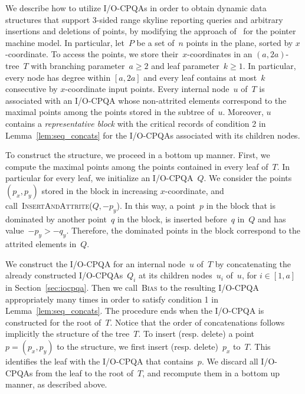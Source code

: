 \documentclass[]{article}
\begin{document}
We describe how to utilize I/O-CPQAs in order to obtain dynamic data structures
that support 3-sided range skyline reporting queries and arbitrary insertions
and deletions of points, by modifying the approach of~\cite{OL81} for the
pointer machine model. In particular, let~$P$ be a set of~$n$ points in the
plane, sorted by $x$-coordinate. To access the points, we store
their~$x$-coordinates in an $(a,2a)$-tree~$T$ with branching parameter~$a\geq 2$
and leaf parameter~$k\geq1$. In particular, every node has degree within
$[a,2a]$ and every leaf contains at most~$k$ consecutive by $x$-coordinate input
points. Every internal node~$u$ of~$T$ is associated with an I/O-CPQA whose
non-attrited elements correspond to the maximal points among the points stored
in the subtree of~$u$. Moreover, $u$ contains a \textit{representative block}
with the critical records of condition 2 in Lemma~\ref{lem:seq_concats} for the
I/O-CPQAs associated with its children nodes.

To construct the structure, we proceed in a bottom up manner. First, we compute
the maximal points among the points contained in every leaf of~$T$. In
particular for every leaf, we initialize an I/O-CPQA~$Q$. We consider the
points~$(p_x,p_y)$ stored in the block in increasing $x$-coordinate, and
call~\textsc{InsertAndAttrite}($Q,-p_y$). In this way, a point~$p$ in the block
that is dominated by another point~$q$ in the block, is inserted before~$q$
in~$Q$ and has value~$-p_y > -q_y$. Therefore, the
dominated points in the block correspond to the attrited elements in~$Q$.

We construct the I/O-CPQA for an internal node~$u$ of~$T$ by concatenating the
already constructed I/O-CPQAs~$Q_{i}$ at its children nodes~$u_i$ of~$u$, for $
i \in [1,a]$ in Section~\ref{sec:iocpqa}. Then we call~\textsc{Bias} to
the resulting I/O-CPQA appropriately many times in order to satisfy condition 1
in Lemma~\ref{lem:seq_concats}. The procedure ends when the I/O-CPQA is
constructed for the root of~$T$. Notice that the order of concatenations
follows implicitly the structure of the tree~$T$. To insert (resp. delete) a
point~$p =(p_x,p_y)$ to the structure, we first insert (resp.
delete)~$p_x$ to~$T$. This identifies the leaf with the I/O-CPQA that
contains~$p$. We discard all I/O-CPQAs from the leaf to the root of~$T$, and
recompute them in a bottom up manner, as described above.
\end{document}
